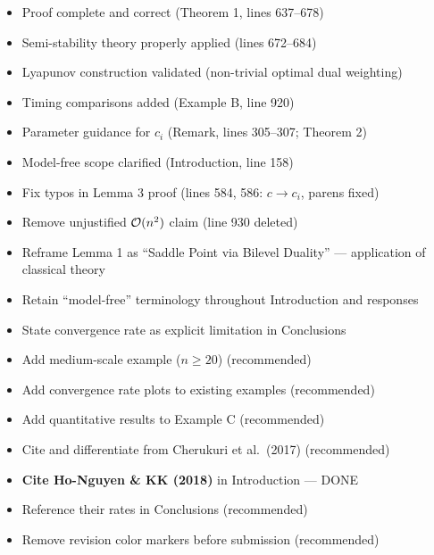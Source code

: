 \documentclass[journal,twoside,web]{ieeecolor}
\begin{document}
\begin{itemize}
\item[\checkmark] {\color{ForestGreen}Proof complete and correct} (Theorem 1, lines 637--678)
\item[\checkmark] {\color{ForestGreen}Semi-stability theory properly applied} (lines 672--684)
\item[\checkmark] {\color{ForestGreen}Lyapunov construction validated} (non-trivial optimal dual weighting)
\item[\checkmark] {\color{ForestGreen}Timing comparisons added} (Example B, line 920)
\item[\checkmark] {\color{ForestGreen}Parameter guidance for $c_i$} (Remark, lines 305--307; Theorem 2)
\item[\checkmark] {\color{ForestGreen}Model-free scope clarified} (Introduction, line 158)
\item[\checkmark] {\color{ForestGreen}Fix typos in Lemma 3 proof} (lines 584, 586: $c \to c_i$, parens fixed)
\item[\checkmark] {\color{ForestGreen}Remove unjustified ${\cal O}(n^2)$ claim} (line 930 deleted)
\item[\checkmark] {\color{ForestGreen}Reframe Lemma 1} as ``Saddle Point via Bilevel Duality'' --- application of classical theory
\item[\checkmark] {\color{ForestGreen}Retain ``model-free'' terminology} throughout Introduction and responses
\item[\checkmark] {\color{ForestGreen}State convergence rate as explicit limitation} in Conclusions
\item[$\square$] {\color{orange}Add medium-scale example ($n \geq 20$)} (recommended)
\item[$\square$] {\color{orange}Add convergence rate plots to existing examples} (recommended)
\item[$\square$] {\color{orange}Add quantitative results to Example C} (recommended)
\item[$\square$] {\color{orange}Cite and differentiate from Cherukuri et al.\ (2017)} (recommended)
\item[\checkmark] {\color{ForestGreen}\textbf{Cite Ho-Nguyen \& KK (2018)}} in Introduction --- DONE
\item[$\square$] {\color{orange}Reference their rates in Conclusions} (recommended)
\item[$\square$] {\color{orange}Remove revision color markers before submission} (recommended)
\end{itemize}
\end{document}
